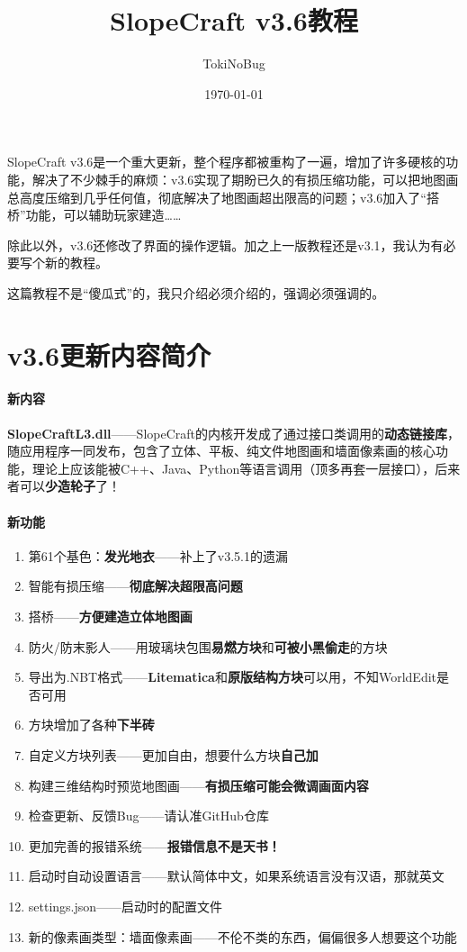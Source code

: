 \documentclass[UTF8]{ctexart}
\title{SlopeCraft v3.6教程}
\author{TokiNoBug}
\date{\today}
\begin{document}
    \maketitle
    SlopeCraft v3.6是一个重大更新，整个程序都被重构了一遍，增加了许多硬核的功能，解决了不少棘手的麻烦：v3.6实现了期盼已久的有损压缩功能，可以把地图画总高度压缩到几乎任何值，彻底解决了地图画超出限高的问题；v3.6加入了“搭桥”功能，可以辅助玩家建造……
    
    除此以外，v3.6还修改了界面的操作逻辑。加之上一版教程还是v3.1，我认为有必要写个新的教程。

    这篇教程不是“傻瓜式”的，我只介绍必须介绍的，强调必须强调的。

    \pagebreak
    \section{v3.6更新内容简介}
    \paragraph{新内容}
    \textbf{SlopeCraftL3.dll}——SlopeCraft的内核开发成了通过接口类调用的\textbf{动态链接库}，随应用程序一同发布，包含了立体、平板、纯文件地图画和墙面像素画的核心功能，理论上应该能被C++、Java、Python等语言调用（顶多再套一层接口），后来者可以\textbf{少造轮子}了！

    \paragraph{新功能}
    \begin{enumerate}
        \item 第61个基色：\textbf{发光地衣}——补上了v3.5.1的遗漏
        \item 智能有损压缩——\textbf{彻底解决超限高问题}
        \item 搭桥——\textbf{方便建造立体地图画}
        \item 防火/防末影人——用玻璃块包围\textbf{易燃方块}和\textbf{可被小黑偷走}的方块
        \item 导出为.NBT格式——\textbf{Litematica}和\textbf{原版结构方块}可以用，不知WorldEdit是否可用
        \item 方块增加了各种\textbf{下半砖}
        \item 自定义方块列表——更加自由，想要什么方块\textbf{自己加}
        \item 构建三维结构时预览地图画——\textbf{有损压缩可能会微调画面内容}
        \item 检查更新、反馈Bug——请认准GitHub仓库
        \item 更加完善的报错系统——\textbf{报错信息不是天书！}
        \item 启动时自动设置语言——默认简体中文，如果系统语言没有汉语，那就英文
        \item settings.json——启动时的配置文件
        \item 新的像素画类型：墙面像素画——不伦不类的东西，偏偏很多人想要这个功能
    \end{enumerate}
\end{document}
